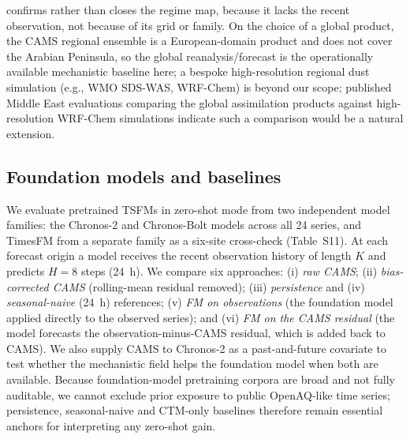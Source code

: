 \documentclass[review,times,authoryear]{elsarticle}
\begin{document}
confirms rather than closes the regime map, because it lacks the recent observation, not because of its grid or family. On the choice of a global product, the CAMS regional ensemble is a European-domain product and does not cover the Arabian Peninsula, so the global reanalysis/forecast is the operationally available mechanistic baseline here; a bespoke high-resolution regional dust simulation (e.g., WMO SDS-WAS, WRF-Chem) is beyond our scope; published Middle East evaluations comparing the global assimilation products against high-resolution WRF-Chem simulations \citep{ukhov2020} indicate such a comparison would be a natural extension.

\subsection{Foundation models and baselines}
We evaluate pretrained TSFMs in zero-shot mode from two independent model families: the Chronos-2 and Chronos-Bolt models \citep{ansari2024} across all 24 series, and TimesFM \citep{das2023} from a separate family as a six-site cross-check (Table~S11). At each forecast origin a model receives the recent observation history of length $K$ and predicts $H=8$ steps (24~h). We compare six approaches: (i) \emph{raw CAMS}; (ii) \emph{bias-corrected CAMS} (rolling-mean residual removed); (iii) \emph{persistence} and (iv) \emph{seasonal-naive} (24~h) references; (v) \emph{FM on observations} (the foundation model applied directly to the observed series); and (vi) \emph{FM on the CAMS residual} (the model forecasts the observation-minus-CAMS residual, which is added back to CAMS). We also supply CAMS to Chronos-2 as a past-and-future covariate to test whether the mechanistic field helps the foundation model when both are available. Because foundation-model pretraining corpora are broad and not fully auditable, we cannot exclude prior exposure to public OpenAQ-like time series; persistence, seasonal-naive and CTM-only baselines therefore remain essential anchors for interpreting any zero-shot gain.
\end{document}
